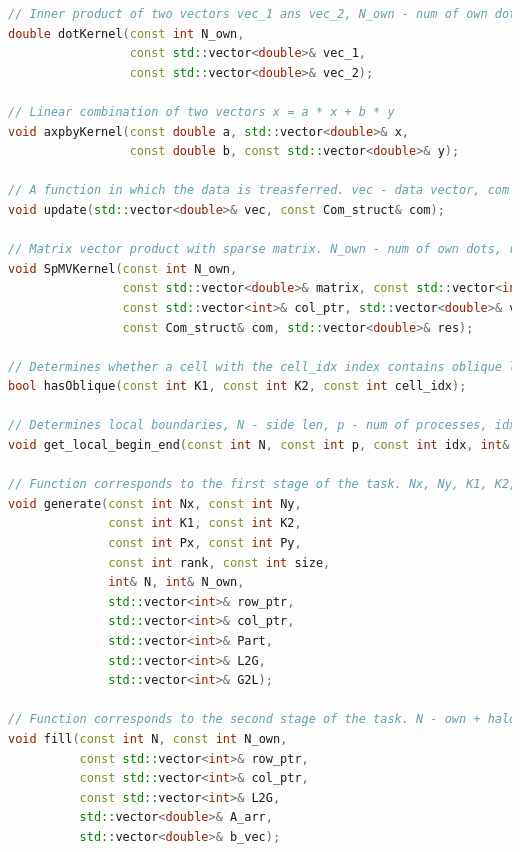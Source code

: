 	\begin{lstlisting}[numbersep=10pt, language=C++, caption=\textbf{Реализованные функции}]
// Inner product of two vectors vec_1 ans vec_2, N_own - num of own dots
double dotKernel(const int N_own,
                 const std::vector<double>& vec_1,
                 const std::vector<double>& vec_2);

// Linear combination of two vectors x = a * x + b * y
void axpbyKernel(const double a, std::vector<double>& x,
	             const double b, const std::vector<double>& y);

// A function in which the data is treasferred. vec - data vector, com - exchange scheme
void update(std::vector<double>& vec, const Com_struct& com);

// Matrix vector product with sparse matrix. N_own - num of own dots, row_ptr, col_ptr - CSR representation, res = Matrix * vec, com - exchange scheme
void SpMVKernel(const int N_own,
                const std::vector<double>& matrix, const std::vector<int>& row_ptr,
                const std::vector<int>& col_ptr, std::vector<double>& vec,
                const Com_struct& com, std::vector<double>& res);

// Determines whether a cell with the cell_idx index contains oblique line,  K1, K2 - parameters that determine the distribution of oblique lines
bool hasOblique(const int K1, const int K2, const int cell_idx);

// Determines local boundaries, N - side len, p - num of processes, idx - current process index, b, e - begin and end
void get_local_begin_end(const int N, const int p, const int idx, int& b, int& e);

// Function corresponds to the first stage of the task. Nx, Ny, K1, K2, Px, Py- determine the configuration of a two-dimensional grid, rank - rank of the process, size - total processes, N - own + halo, N_own - own, row_ptr, col_ptr - CSR representation, Part - ranks of vertex owners, L2G, G2L - local to global and global to local mapping
void generate(const int Nx, const int Ny,
	          const int K1, const int K2,
	          const int Px, const int Py,
	          const int rank, const int size,
	          int& N, int& N_own, 
	          std::vector<int>& row_ptr,
	          std::vector<int>& col_ptr,
	          std::vector<int>& Part,
	          std::vector<int>& L2G,
	          std::vector<int>& G2L);

// Function corresponds to the second stage of the task. N - own + halo, N_own - own, row_ptr, col_ptr - CSR representation, L2G - local to global mapping, A_arr, b_vec - fillable matrix and vector
void fill(const int N, const int N_own,
          const std::vector<int>& row_ptr,
          const std::vector<int>& col_ptr,
          const std::vector<int>& L2G,
          std::vector<double>& A_arr,
          std::vector<double>& b_vec);


\end{lstlisting}
